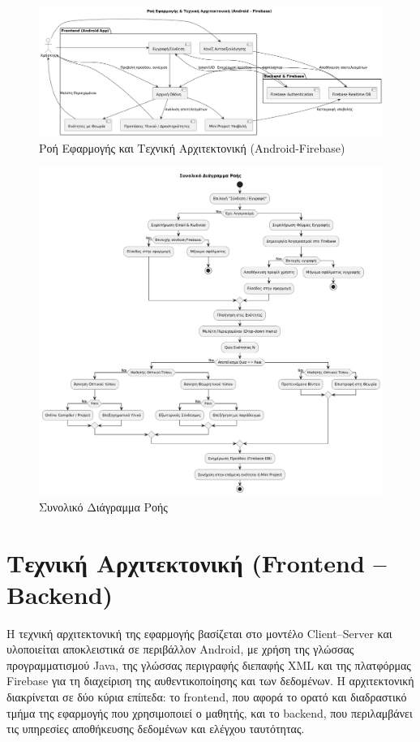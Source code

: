 \documentclass[11pt]{report}
\begin{document}
\begin{figure}[H]
    \centering
    \includegraphics[width=0.9\linewidth]{Figures/image003.png}
    \caption{Ροή Εφαρμογής και Τεχνική Αρχιτεκτονική (Android-Firebase)}
    \label{fig:architecture-flow}
\end{figure}

\begin{figure}[H]
    \centering
    \includegraphics[width=0.9\linewidth]{Figures/image004.png}
    \caption{Συνολικό Διάγραμμα Ροής}
    \label{fig:architecture-flow}
\end{figure}

\section{Τεχνική Αρχιτεκτονική (Frontend – Backend)}

Η τεχνική αρχιτεκτονική της εφαρμογής βασίζεται στο μοντέλο Client–Server και υλοποιείται αποκλειστικά σε περιβάλλον Android, με χρήση της γλώσσας προγραμματισμού Java, της γλώσσας περιγραφής διεπαφής XML και της πλατφόρμας Firebase για τη διαχείριση της αυθεντικοποίησης και των δεδομένων. Η αρχιτεκτονική διακρίνεται σε δύο κύρια επίπεδα: το frontend, που αφορά το ορατό και διαδραστικό τμήμα της εφαρμογής που χρησιμοποιεί ο μαθητής, και το backend, που περιλαμβάνει τις υπηρεσίες αποθήκευσης δεδομένων και ελέγχου ταυτότητας. 
\end{document}

